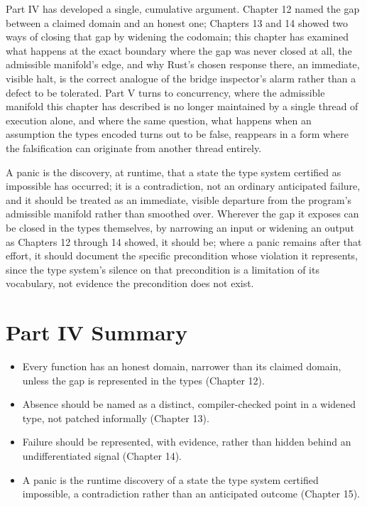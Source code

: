 \documentclass[11pt]{book}
\begin{document}
Part IV has developed a single, cumulative argument. Chapter 12 named the gap between a claimed domain and an honest one; Chapters 13 and 14 showed two ways of closing that gap by widening the codomain; this chapter has examined what happens at the exact boundary where the gap was never closed at all, the admissible manifold's edge, and why Rust's chosen response there, an immediate, visible halt, is the correct analogue of the bridge inspector's alarm rather than a defect to be tolerated. Part V turns to concurrency, where the admissible manifold this chapter has described is no longer maintained by a single thread of execution alone, and where the same question, what happens when an assumption the types encoded turns out to be false, reappears in a form where the falsification can originate from another thread entirely.

\begin{invariantbox}
A panic is the discovery, at runtime, that a state the type system certified as impossible has occurred; it is a contradiction, not an ordinary anticipated failure, and it should be treated as an immediate, visible departure from the program's admissible manifold rather than smoothed over. Wherever the gap it exposes can be closed in the types themselves, by narrowing an input or widening an output as Chapters 12 through 14 showed, it should be; where a panic remains after that effort, it should document the specific precondition whose violation it represents, since the type system's silence on that precondition is a limitation of its vocabulary, not evidence the precondition does not exist.
\end{invariantbox}

\clearpage

\clearpage

\section*{Part IV Summary}

\begin{itemize}
\item Every function has an honest domain, narrower than its claimed domain, unless the gap is represented in the types (Chapter 12).
\item Absence should be named as a distinct, compiler-checked point in a widened type, not patched informally (Chapter 13).
\item Failure should be represented, with evidence, rather than hidden behind an undifferentiated signal (Chapter 14).
\item A panic is the runtime discovery of a state the type system certified impossible, a contradiction rather than an anticipated outcome (Chapter 15).
\end{itemize}
\end{document}
